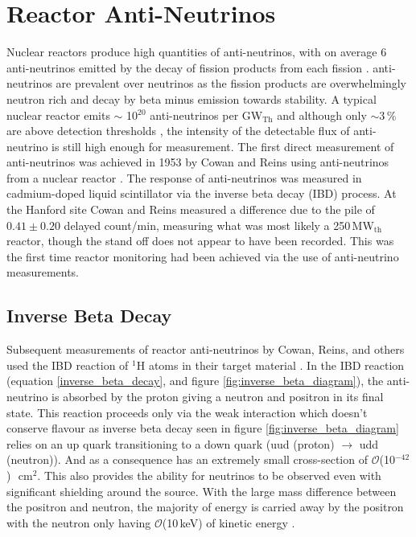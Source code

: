 \section{Reactor Anti-Neutrinos} \label{sec:reactorAntiNeutrinos}
Nuclear reactors produce high quantities of anti-neutrinos, with on average 6 anti-neutrinos emitted by the decay of fission products from each fission \cite{Mueller_2011}. anti-neutrinos are prevalent over neutrinos as the fission products are overwhelmingly neutron rich and decay by beta minus emission towards stability. A typical nuclear reactor emits $\sim$ 10$^{20}$ anti-neutrinos per GW$_{\textrm{Th}}$ \cite{Mueller_2011} and although only $\sim$3\,\% are above detection thresholds \cite{Mueller_2011}, the intensity of the detectable flux of anti-neutrino is still high enough for measurement. The first direct measurement of anti-neutrinos was achieved in 1953 by Cowan and Reins using anti-neutrinos from a nuclear reactor \cite{reines1953detection}. The response of anti-neutrinos was measured in cadmium-doped liquid scintillator \cite{reines1953proposed} \cite{Cowan1956Confirmation} via the inverse beta decay (IBD) process. At the Hanford site Cowan and Reins measured a difference due to the pile of $0.41 \pm 0.20$ delayed count/min\cite{reines1953detection}, measuring what was most likely a 250\,MW$_{\textrm{th}}$ reactor, though the stand off does not appear to have been recorded. This was the first time reactor monitoring had been achieved via the use of anti-neutrino measurements. 

\subsection{Inverse Beta Decay} \label{subSec:IBD}
Subsequent measurements of reactor anti-neutrinos by Cowan, Reins, and others used
the IBD reaction of $^1$H atoms in their target material \cite{Cowan1956Confirmation} \cite{sno2001} \cite{superK2001}. In the IBD reaction (equation \ref{inverse_beta_decay}, and figure \ref{fig:inverse_beta_diagram}), the anti-neutrino is absorbed by the proton giving a neutron and positron in  its final state. This reaction proceeds only via the weak interaction which doesn't conserve flavour as inverse beta decay seen in figure \ref{fig:inverse_beta_diagram} relies on an up quark transitioning to a down quark (uud (proton) $\rightarrow$ udd (neutron)). And as a consequence has an extremely small cross-section of $\mathcal{O}$(10$^{-42}$)\,~cm$^2$\cite{Vogel_1999}. This also provides the ability for neutrinos to be observed even with significant shielding around the source. With the large mass difference between the positron and neutron, the majority of energy is carried away by the positron with the neutron only having $\mathcal{O}$(10\,keV) of kinetic energy \cite{Vogel_1999}.

